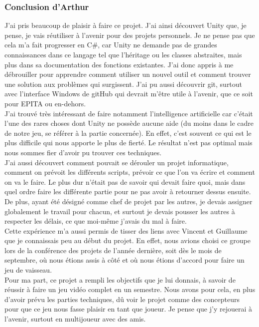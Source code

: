 \documentclass[12pt, titlepage]{article}
\begin{document}
\begin{spacing}{1.5}
\subsubsection{Conclusion d'Arthur}

J'ai pris beaucoup de plaisir à faire ce projet. J'ai ainsi découvert Unity que, je pense, je vais réutiliser à l'avenir pour des projets personnels. Je ne pense pas que cela m'a fait progresser en C\#, car Unity ne demande pas de grandes connaissances dans ce langage tel que l'héritage ou les classes abstraites, mais plus dans sa documentation des fonctions existantes. J'ai donc appris à me débrouiller pour apprendre comment utiliser un nouvel outil et comment trouver une solution aux problèmes qui surgissent. J'ai pu aussi découvrir git, surtout avec l'interface Windows de gitHub qui devrait m'être utile à l'avenir, que ce soit pour EPITA ou en-dehors.\\

J'ai trouvé très intéressant de faire notamment l'intelligence artificielle car c'était l'une des rares choses dont Unity ne possède aucune aide (du moins dans le cadre de notre jeu, se référer à la partie concernée). En effet, c'est souvent ce qui est le plus difficile qui nous apporte le plus de fierté. Le résultat n'est pas optimal mais nous sommes fier d'avoir pu trouver ces techniques.\\

J'ai aussi découvert comment pouvait se dérouler un projet informatique, comment on prévoit les différents scripts, prévoir ce que l'on va écrire et comment on va le faire. Le plus dur n'était pas de savoir qui devait faire quoi, mais dans quel ordre faire les différente partie pour ne pas avoir à retourner dessus ensuite. De plus, ayant été désigné comme chef de projet par les autres, je devais assigner globalement le travail pour chacun, et surtout je devais pousser les autres à respecter les délais, ce que moi-même j'avais du mal à faire.\\

Cette expérience m'a aussi permis de tisser des liens avec Vincent et Guillaume que je connaissais peu au début du projet. En effet, nous avions choisi ce groupe lors de la conférence des projets de l'année dernière, soit dès le mois de septembre, où nous étions assis à côté et où nous étions d'accord pour faire un jeu de vaisseau.\\

Pour ma part, ce projet a rempli les objectifs que je lui donnais, à savoir de réussir à faire un jeu vidéo complet en un semestre. Nous avons pour cela, en plus d'avoir prévu les parties techniques, dû voir le projet comme des concepteurs pour que ce jeu nous fasse plaisir en tant que joueur. Je pense que j'y rejouerai à l'avenir, surtout en multijoueur avec des amis.\\


\end{spacing}
\end{document}
